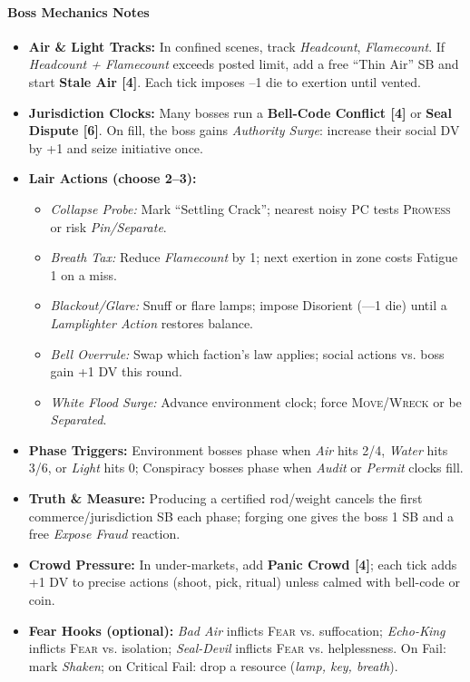 \paragraph{Boss Mechanics Notes}
\begin{itemize}
  \item \textbf{Air \& Light Tracks:} In confined scenes, track \emph{Headcount}, \emph{Flamecount}. If \emph{Headcount + Flamecount} exceeds posted limit, add a free ``Thin Air'' SB and start \textbf{Stale Air [4]}. Each tick imposes --1 die to exertion until vented.
  \item \textbf{Jurisdiction Clocks:} Many bosses run a \textbf{Bell-Code Conflict [4]} or \textbf{Seal Dispute [6]}. On fill, the boss gains \emph{Authority Surge}: increase their social DV by +1 and seize initiative once.
  \item \textbf{Lair Actions (choose 2--3):}
    \begin{itemize}
      \item \emph{Collapse Probe:} Mark ``Settling Crack''; nearest noisy PC tests \textsc{Prowess} or risk \emph{Pin/Separate}.
      \item \emph{Breath Tax:} Reduce \emph{Flamecount} by 1; next exertion in zone costs Fatigue 1 on a miss.
      \item \emph{Blackout/Glare:} Snuff or flare lamps; impose Disorient (---1 die) until a \emph{Lamplighter Action} restores balance.
      \item \emph{Bell Overrule:} Swap which faction’s law applies; social actions vs. boss gain +1 DV this round.
      \item \emph{White Flood Surge:} Advance environment clock; force \textsc{Move}/\textsc{Wreck} or be \emph{Separated}.
    \end{itemize}
  \item \textbf{Phase Triggers:} Environment bosses phase when \emph{Air} hits 2/4, \emph{Water} hits 3/6, or \emph{Light} hits 0; Conspiracy bosses phase when \emph{Audit} or \emph{Permit} clocks fill.
  \item \textbf{Truth \& Measure:} Producing a certified rod/weight cancels the first commerce/jurisdiction SB each phase; forging one gives the boss 1 SB and a free \emph{Expose Fraud} reaction.
  \item \textbf{Crowd Pressure:} In under-markets, add \textbf{Panic Crowd [4]}; each tick adds +1 DV to precise actions (shoot, pick, ritual) unless calmed with bell-code or coin.
  \item \textbf{Fear Hooks (optional):} \emph{Bad Air} inflicts \textsc{Fear} vs. suffocation; \emph{Echo-King} inflicts \textsc{Fear} vs. isolation; \emph{Seal-Devil} inflicts \textsc{Fear} vs. helplessness. On Fail: mark \emph{Shaken}; on Critical Fail: drop a resource (\emph{lamp, key, breath}).
\end{itemize}